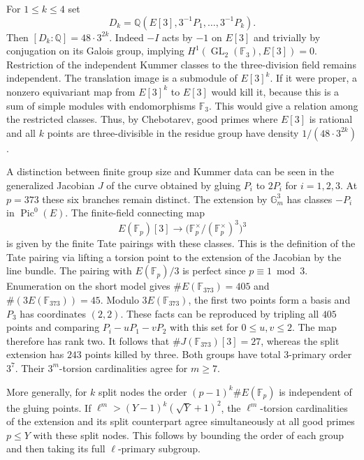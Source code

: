 \documentclass[11pt]{article}
\begin{document}
For $1\le k\le4$ set
\[
 D_k=\mathbb Q(E[3],3^{-1}P_1,\ldots,3^{-1}P_k).
\]
Then $[D_k:\mathbb Q]=48\cdot3^{2k}$. Indeed $-I$ acts by $-1$
on $E[3]$ and trivially by conjugation on its Galois group, implying
$H^1(\operatorname{GL}_2(\mathbb F_3),E[3])=0$. Restriction of the
independent Kummer classes to the three-division field remains
independent. The translation image is a submodule of $E[3]^k$. If
it were proper, a nonzero equivariant map from $E[3]^k$ to $E[3]$
would kill it, because this is a sum of simple modules with
endomorphisms $\mathbb F_3$. This would give a relation among the
restricted classes. Thus, by Chebotarev, good primes where $E[3]$
is rational and all $k$ points are three-divisible in the residue
group have density $1/(48\cdot3^{2k})$.

A distinction between finite group size and Kummer data can be seen
in the generalized Jacobian $J$ of the curve obtained by gluing
$P_i$ to $2P_i$ for $i=1,2,3$. At $p=373$ these six branches remain
distinct. The extension by $\mathbb G_m^3$ has classes $-P_i$ in
$\operatorname{Pic}^0(E)$. The finite-field connecting map
\[
 E(\mathbb F_p)[3]\longrightarrow
 \bigl(\mathbb F_p^\times/(\mathbb F_p^\times)^3\bigr)^3
\]
is given by the finite Tate pairings with these classes. This is the
definition of the Tate pairing via lifting a torsion point to the
extension of the Jacobian by the line bundle. The pairing with
$E(\mathbb F_p)/3$ is perfect since $p\equiv1\bmod3$. Enumeration
on the short model gives $\#E(\mathbb F_{373})=405$ and
$\#(3E(\mathbb F_{373}))=45$. Modulo $3E(\mathbb F_{373})$, the first
two points form a basis and $P_3$ has coordinates $(2,2)$. These
facts can be reproduced by tripling all $405$ points and comparing
$P_i-uP_1-vP_2$ with this set for $0\le u,v\le2$. The map therefore
has rank two. It follows that $\#J(\mathbb F_{373})[3]=27$, whereas
the split extension has $243$ points killed by three. Both groups
have total $3$-primary order $3^7$. Their $3^m$-torsion
cardinalities agree for $m\ge7$.

More generally, for $k$ split nodes the order
$(p-1)^k\#E(\mathbb F_p)$ is independent of the gluing points. If
$\ell^m>(Y-1)^k(\sqrt Y+1)^2$, the $\ell^m$-torsion cardinalities
of the extension and its split counterpart agree simultaneously
at all good primes $p\le Y$ with these split nodes. This follows by
bounding the order of each group and then taking its full
$\ell$-primary subgroup.
\end{document}
